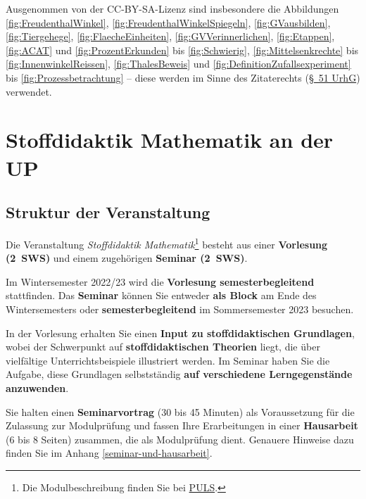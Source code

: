 \documentclass[
]{scrbook}
\theoremstyle{definition}
\theoremstyle{definition}
\theoremstyle{definition}
\theoremstyle{definition}
\theoremstyle{remark}
\begin{document}
Ausgenommen von der CC-BY-SA-Lizenz sind insbesondere die Abbildungen \ref{fig:FreudenthalWinkel}, \ref{fig:FreudenthalWinkelSpiegeln}, \ref{fig:GVausbilden}, \ref{fig:Tiergehege}, \ref{fig:FlaecheEinheiten}, \ref{fig:GVVerinnerlichen}, \ref{fig:Etappen}, \ref{fig:ACAT} und \ref{fig:ProzentErkunden} bis \ref{fig:Schwierig}, \ref{fig:Mittelsenkrechte} bis \ref{fig:InnenwinkelReissen}, \ref{fig:ThalesBeweis} und \ref{fig:DefinitionZufallsexperiment} bis \ref{fig:Prozessbetrachtung} -- diese werden im Sinne des Zitaterechts (\href{https://www.gesetze-im-internet.de/urhg/__51.html}{§~51 UrhG}) verwendet.

\hypertarget{stoffdidaktik-mathematik-an-der-up}{%
\chapter*{Stoffdidaktik Mathematik an der UP}\label{stoffdidaktik-mathematik-an-der-up}}

\hypertarget{struktur-der-veranstaltung}{%
\section*{Struktur der Veranstaltung}\label{struktur-der-veranstaltung}}

Die Veranstaltung \emph{Stoffdidaktik Mathematik}\footnote{Die Modulbeschreibung finden Sie bei \href{https://puls.uni-potsdam.de/qisserver/rds?state=verpublish\&status=init\&vmfile=no\&moduleCall=modulansicht\&publishConfFile=modulverwaltung\&publishSubDir=up/modulbearbeiter\&\&modul.modul_id=3155\&menuid=\&topitem=Modulbeschreibung\&subitem=}{PULS}.} besteht aus einer \textbf{Vorlesung (2~SWS)} und einem zugehörigen \textbf{Seminar (2~SWS)}.

Im Wintersemester 2022/23 wird die \textbf{Vorlesung semesterbegleitend} stattfinden. Das \textbf{Seminar} können Sie entweder \textbf{als Block} am Ende des Wintersemesters oder \textbf{semesterbegleitend} im Sommersemester 2023 besuchen.

In der Vorlesung erhalten Sie einen \textbf{Input zu stoffdidaktischen Grundlagen}, wobei der Schwerpunkt auf \textbf{stoffdidaktischen Theorien} liegt, die über vielfältige Unterrichtsbeispiele illustriert werden. Im Seminar haben Sie die Aufgabe, diese Grundlagen selbstständig \textbf{auf verschiedene Lerngegenstände anzuwenden}.

Sie halten einen \textbf{Seminarvortrag} (30 bis 45 Minuten) als Voraussetzung für die Zulassung zur Modulprüfung und fassen Ihre Erarbeitungen in einer \textbf{Hausarbeit} (6 bis 8 Seiten) zusammen, die als Modulprüfung dient. Genauere Hinweise dazu finden Sie im Anhang \ref{seminar-und-hausarbeit}.
\end{document}
